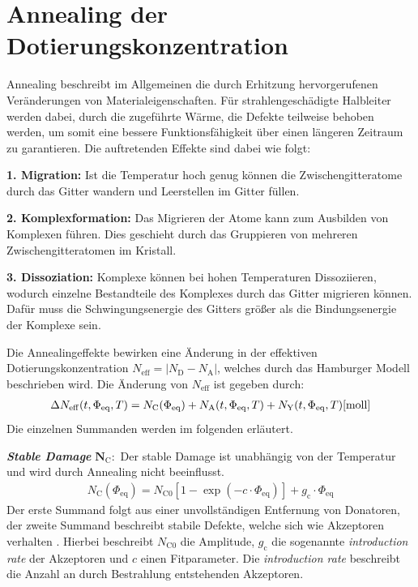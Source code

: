 \section{Annealing der Dotierungskonzentration}
Annealing beschreibt im Allgemeinen die durch Erhitzung hervorgerufenen Veränderungen von Materialeigenschaften. Für strahlengeschädigte
Halbleiter werden dabei, durch die zugeführte Wärme, die Defekte teilweise behoben werden, um somit eine
bessere Funktionsfähigkeit über einen längeren Zeitraum zu garantieren. Die auftretenden Effekte sind dabei wie folgt:

\textbf{1. Migration:} Ist die Temperatur hoch genug können die Zwischengitteratome durch das Gitter wandern und
Leerstellen im Gitter füllen.

\textbf{2. Komplexformation:} Das Migrieren der Atome kann zum Ausbilden von Komplexen führen. Dies geschieht durch das
Gruppieren von mehreren Zwischengitteratomen im Kristall.

\textbf{3. Dissoziation:} Komplexe können bei hohen Temperaturen Dissoziieren, wodurch einzelne Bestandteile des Komplexes
durch das Gitter migrieren können. Dafür muss die Schwingungsenergie des Gitters größer als die Bindungsenergie der Komplexe sein.

Die Annealingeffekte bewirken eine Änderung in der effektiven Dotierungskonzentration
${N_{\mathrm{eff}}= |N_{\mathrm{D}}-N_{\mathrm{A}}|}$,
welches durch das Hamburger Modell beschrieben wird.
Die Änderung von $N_{\mathrm{eff}}$ ist gegeben durch:
\begin{align}
  \Delta N_{\mathrm{eff}}(t, \Phi_{\mathrm{eq}}, T)   = N_{\mathrm{C}}(\Phi_{\mathrm{eq}}) + N_{\mathrm{A}}(t, \Phi_{\mathrm{eq}}, T) + N_{\mathrm{Y}}(t, \Phi_{\mathrm{eq}}, T) \text{\cite{moll}}
  \label{eqn:N_eff}
\end{align}
Die einzelnen Summanden werden im folgenden erläutert.

\textbf{\textit{Stable Damage}} $\symbf{N_{\mathrm{C}}}:$ Der stable Damage ist unabhängig von der Temperatur und wird durch Annealing nicht beeinflusst.
\begin{align}
  N_{\mathrm{C}}(\Phi_{\mathrm{eq}}) = N_{\mathrm{C0}}[1-\exp{(-c \cdot \Phi_{\mathrm{eq}})}] + g_{\mathrm{c}} \cdot \Phi_{\mathrm{eq}}
\end{align}
Der erste Summand folgt aus einer unvollständigen Entfernung von Donatoren, der zweite Summand beschreibt stabile Defekte, welche sich wie Akzeptoren verhalten \cite{beyer}.
Hierbei beschreibt $N_{\mathrm{C0}}$ die Amplitude, $g_{\mathrm{c}}$ die sogenannte \textit{introduction rate} der Akzeptoren und $c$ einen Fitparameter.
Die \textit{introduction rate} beschreibt die Anzahl an durch Bestrahlung entstehenden Akzeptoren.

